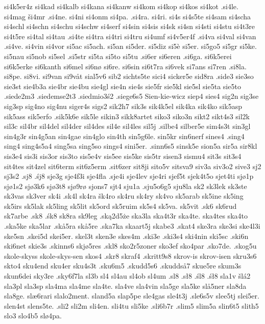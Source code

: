 {{si4k5er4z
si4kad
si4kalb
si4kana
si4kanw
si4kom
si4kop
si4kos
si4kot
.si4le.
si4mag
ši4mr
.si4ne.
si4ni
si4onm
si4pa.
.si4ra.
si4ri.
si4s
si4s5te
si4sam
si4scha
si4schl
si4schn
si4schu
si4schw
si4serf
si4sin
si4sis
si4sk
si4sn
si4sti
si4stu
si4t3re
si4t5re
si4tal
si4tau
.si4te
si4tra
si4tri
si4tru
si4umf
si4v5er4f
.si4va
si4val
si4van
.si4ve.
si4vin
si4vor
si5ac
si5ach.
si5an
si5der.
si5diz
si5è
si5er.
si5go5
si5gr
si5ke.
si5nau
si5nob
si5sel
.si5str
si5ta
si5to
si5tu
.si6er
si6eren
.si6ga.
si6k5erei
si6k5erke
si6kanth
si6mel
si6nø
si6re.
si6sin
si6t7ra
si6vek
si7ans
si7ren
.si8la.
si8pe.
si8vi.
si9van
si9våt
sial5v6
sib2
sichts5te
sici4
sicker5e
sid8ra
.side3
sie3so
sie3st
sie4b3a
sie4br
sie4bu
sie4gl
sie4n
sie4s
sie5fr
sie5kl
sie5sl
sie5ta
sie5to
.siede2m3
.siedemse2t3
.siedmio3ś2
.siege6s5
Sien-kie-wicz
siep4
sies4
sig2n
sig3se
sig3sp
sig4no
sig4nu
siger4s
sigs2
sik2h7
sik3s
sik4k5el
sik4ka
sik4ko
sik5asp
sik5ass
sik5erfo
.sik5k6e
sik5le
sikin3
sikk8artet
siko3
siko3n
sikt2
sikt4s3
sil2k
sil3c
sil4br
sil4del
sil4der
sil4des
sil4e
sil4les
sil5j
.silbe4
silber5e
sim4s3t
sin3gl
sin4g3r
sin4g5an
sin4gae
sin4glo
sin4th
sin5g6le.
sin5kr
sin6nerf
sines4
.sing4
sing4
sing4s5a4
sing5sa
sing5so
sings4
sini5er.
.sinn6s5
sinsk5e
sion5a
sir5a
sir8kl
sis3e4
sis3i
sis3or
sis3to
sis5e4v
sis5ee
sis5ke
sis5tr
sisen3
sismu4
sit3s
sit3s4
sit4tes
sit4zel
sit6term
sit6z5erm
.sit6zer
sit8ji
sito5v
sitsva9
siv3a
siv3o2
sive3
sj2
sj3s2
.sj8
.śj8
sje3g
sje4f3i
sje4fla
.sje4i
sje4lev
sje4ri
sjef5t
sjek4t5o
sjet4ti
sjø1p
sjø1s2
sjø3k6
sjø3t8
sjø9rø
sjons7
sjt4
sju1a
.sju5o6g5
sju8la
sk2
sk3lek
sk3ste
sk3vas
sk3ver
sk4i
.sk4l
sk4ra
šk4ro
sk4ru
sk4ry
sk4vo
sk5arab
sk5ine
sk5ing
sk5irs
sk5lak
sk5ling
sk5lit
sk5ord
sk5ruim
sk5s4
sk5va.
sk5vit
.sk6
sk6rud
sk7arbe
.sk8
.śk8
sk8ra
sk9leg
.ską2d5że
ska3la
ska4t3r
ska4te.
ska4tes
ska4to
.ska5ke
ska5lar
.skå5ra
skå5re
.ska7ka
skaart5j
skabe3
.skat4
ske3ra
ske3si
ske4l3i
ske5sn
.skei5d
skei5er.
skel3t
sken3e
skes4m
.ski3e
.ski3s4
ski4nin
ski5sc
.ski6n
ski6net
skie3s
.skinns6
skjø5res
.skl8
sko2r5zoner
sko3ef
sko4par
.sko7de.
.skog5u
skole-skyss
skole-skys-sen
skos4
.skr8
skraf4
.skritt9s8
skrov-is
skrov-isen
skru3s6
skto4
sku4end
sku4er
sku4s3t
.sku6m5
.skudd5s6
.skuddså7
skue5re
skum3s
skun6dei
sky3re
.sky6f7la
sl3b
sl4
sl4au
sl4ob
sl4um
.sl8
.sł8
.śl8
.śł8
sla1v
šlá2
sla3pl
sla3sp
sla4ma
sla4me
sla4te.
sla4ve
sla4vin
sla5ge
sla5ke
slå5ner
sla8da
sla8ge.
slæ6rari
slalo2ment.
sland5a
slap5pe
sle4gas
sle4t3j
.sle6s5v
slee5tj
slei5er.
slen4st
slens5te.
.sli2
sli2m
sli4en.
sli4tu
sli5ke
.sli6b7r
.slim5
slim5a
slin6t5
slith5
slo3
slo4b5
slø4pa.
}}
